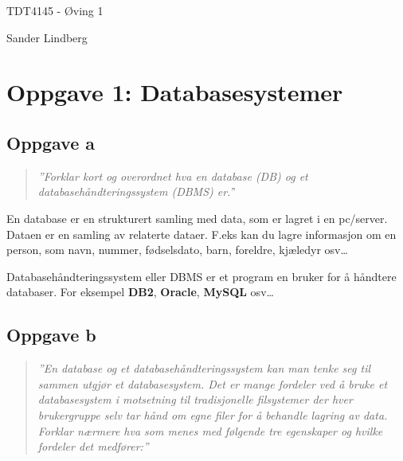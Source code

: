 \documentclass[12pt,a4paper]{article}
\begin{document}
\begin{titlepage}
    \centering
    \vspace*{\fill}

    \vspace*{0.5cm}

    \huge
    TDT4145 - Øving 1

    \vspace*{0.5cm}

    \large Sander Lindberg

    \vspace*{\fill}
    \end{titlepage}

	\newpage
	
	\section{Oppgave 1: Databasesystemer}
		\subsection{Oppgave a}
			\begin{quote}
				\textit{''Forklar kort og overordnet hva en database (DB) og et databasehåndteringssystem
				(DBMS) er.'}'
			\end{quote}
			En database er en strukturert samling med data, som er lagret i en pc/server. Dataen er en samling av relaterte dataer. F.eks kan du lagre 							informasjon om en person, som navn, nummer, fødselsdato, barn, foreldre, kjæledyr osv\dots
			
			Databasehåndteringssystem eller DBMS er et program en bruker for å håndtere databaser. For eksempel \textbf{DB2}, \textbf{Oracle}, 								\textbf{MySQL} osv\dots
			
		\subsection{Oppgave b}
			\begin{quote}
				\textit{
				''En database og et databasehåndteringssystem kan man tenke seg til sammen utgjør
				et databasesystem. Det er mange fordeler ved å bruke et databasesystem i
				motsetning til tradisjonelle filsystemer der hver brukergruppe selv tar hånd om egne
				filer for å behandle lagring av data. Forklar nærmere hva som menes med følgende
				tre egenskaper og hvilke fordeler det medfører:''
				}
			\end{quote}
			
\end{document}
